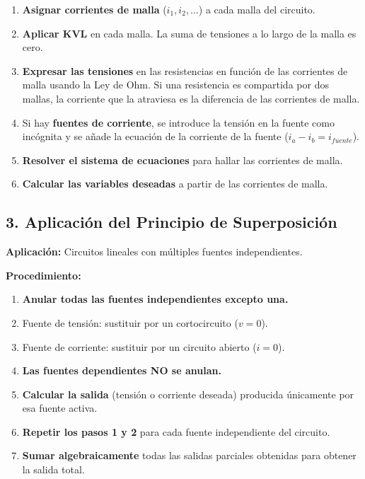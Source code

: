 \documentclass[11pt,a4paper]{article}
\begin{document}
\begin{enumerate}[leftmargin=*,topsep=2pt,itemsep=1pt]
  \item \textbf{Asignar corrientes de malla} ($i_1, i_2, \dots$) a cada malla del circuito.
  \item \textbf{Aplicar KVL} en cada malla. La suma de tensiones a lo largo de la malla es cero.
  \item \textbf{Expresar las tensiones} en las resistencias en función de las corrientes de malla usando la Ley de Ohm. Si una resistencia es compartida por dos mallas, la corriente que la atraviesa es la diferencia de las corrientes de malla.
  \item Si hay \textbf{fuentes de corriente}, se introduce la tensión en la fuente como incógnita y se añade la ecuación de la corriente de la fuente ($i_a - i_b = i_{fuente}$).
  \item \textbf{Resolver el sistema de ecuaciones} para hallar las corrientes de malla.
  \item \textbf{Calcular las variables deseadas} a partir de las corrientes de malla.
\end{enumerate}


\subsection*{3. Aplicación del Principio de Superposición}


\textbf{Aplicación:} Circuitos lineales con múltiples fuentes independientes.


\textbf{Procedimiento:}


\begin{enumerate}[leftmargin=*,topsep=2pt,itemsep=1pt]
  \item \textbf{Anular todas las fuentes independientes excepto una.}
  \item Fuente de tensión: sustituir por un cortocircuito ($v=0$).
  \item Fuente de corriente: sustituir por un circuito abierto ($i=0$).
  \item \textbf{Las fuentes dependientes NO se anulan.}
  \item \textbf{Calcular la salida} (tensión o corriente deseada) producida únicamente por esa fuente activa.
  \item \textbf{Repetir los pasos 1 y 2} para cada fuente independiente del circuito.
  \item \textbf{Sumar algebraicamente} todas las salidas parciales obtenidas para obtener la salida total.
\end{enumerate}
\end{document}
